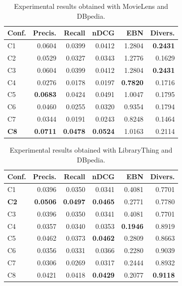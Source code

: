 \begin{table}
\centering
\begin{tabular}{@{}lrrrrr@{}}
\toprule
Conf.       & Precis.         & Recall          & nDCG            & EBN             & Divers. \\ \midrule
C1          & 0.0604          & 0.0399          & 0.0412          & 1.2804          & \textbf{0.2431} \\
C2          & 0.0529          & 0.0327          & 0.0343          & 1.2776          & 0.1629  \\
C3          & 0.0604          & 0.0399          & 0.0412          & 1.2804          & \textbf{0.2431} \\
C4          & 0.0276          & 0.0178          & 0.0197          & \textbf{0.7820} & 0.1716  \\
C5          & \textbf{0.0683} & 0.0424          & 0.0491          & 1.0047          & 0.1795  \\
C6          & 0.0460          & 0.0255          & 0.0320          & 0.9354          & 0.1794  \\
C7          & 0.0344          & 0.0191          & 0.0243          & 0.8248          & 0.1464  \\
\textbf{C8} & \textbf{0.0711} & \textbf{0.0478} & \textbf{0.0524} & 1.0163          & 0.2114  \\ \bottomrule
\end{tabular}
\caption[Experimental results with MovieLens and DBpedia]{Experimental results obtained with MovieLens and DBpedia.}
\label{srr:tab:ex1-ml}
\end{table}

\begin{table}
\centering
\begin{tabular}{@{}lrrrrr@{}}
\toprule
Conf.       & Precis.         & Recall          & nDCG            & EBN             & Divers. \\ \midrule
C1          & 0.0396          & 0.0350          & 0.0341          & 0.4081          & 0.7701  \\
\textbf{C2} & \textbf{0.0506} & \textbf{0.0497} & \textbf{0.0465} & 0.2771          & 0.7780  \\
C3          & 0.0396          & 0.0350          & 0.0341          & 0.4081          & 0.7701  \\
C4          & 0.0357          & 0.0340          & 0.0353          & \textbf{0.1946} & 0.8919  \\
C5          & 0.0462          & 0.0373          & \textbf{0.0462} & 0.2809          & 0.8663  \\
C6          & 0.0356          & 0.0331          & 0.0366          & 0.2280          & 0.9039  \\
C7          & 0.0306          & 0.0269          & 0.0317          & 0.2444          & 0.8932  \\
C8          & 0.0421          & 0.0418          & \textbf{0.0429} & 0.2077          & \textbf{0.9118} \\ \bottomrule
\end{tabular}
\caption[Experimental results with LibraryThing and DBpedia]{Experimental results obtained with LibraryThing and DBpedia.}
\label{srr:tab:ex1-lt}
\end{table}

